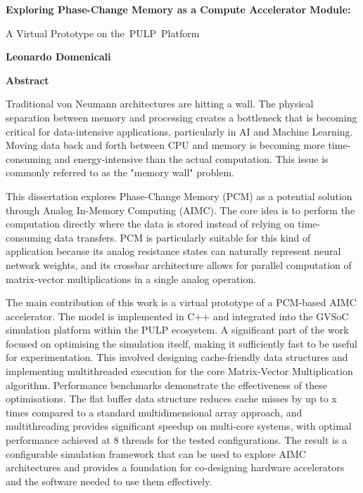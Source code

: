 
\thispagestyle{plain}
\begin{center}
    \Large
    \textbf{Exploring Phase-Change Memory as a Compute Accelerator Module:}
        
    \vspace{0.4cm}
    \large
    A Virtual Prototype on the PULP Platform
        
    \vspace{0.4cm}
    \textbf{Leonardo Domenicali}
       
    \vspace{0.9cm}
    \textbf{Abstract}
\end{center}

Traditional von Neumann architectures are hitting a wall.
The physical separation between memory and processing creates a bottleneck that is becoming critical for data-intensive applications, particularly in AI and Machine Learning.
Moving data back and forth between CPU and memory is becoming more time-consuming and energy-intensive than the actual computation. This issue is commonly referred to as the "memory wall" problem.

This dissertation explores Phase-Change Memory (PCM) as a potential solution through Analog In-Memory Computing (AIMC).
The core idea is to perform the computation directly where the data is stored instead of relying on time-consuming data transfers.
PCM is particularly suitable for this kind of application because its analog resistance states can naturally represent neural network weights, and its crossbar architecture allows for parallel computation of matrix-vector multiplications in a single analog operation.

The main contribution of this work is a virtual prototype of a PCM-based AIMC accelerator. 
The model is implemented in C++ and integrated into the GVSoC simulation platform within the PULP ecosystem.
A significant part of the work focused on optimising the simulation itself, making it sufficiently fast to be useful for experimentation.
This involved designing cache-friendly data structures and implementing multithreaded execution for the core Matrix-Vector Multiplication algorithm.
Performance benchmarks demonstrate the effectiveness of these optimisations.
The flat buffer data structure reduces cache misses by up to x times compared to a standard multidimensional array approach,  %
and multithreading provides significant speedup on multi-core systems, with optimal performance achieved at 8 threads for the tested configurations.
The result is a configurable simulation framework that can be used to explore AIMC architectures and provides a foundation for co-designing hardware accelerators and the software needed to use them effectively.
